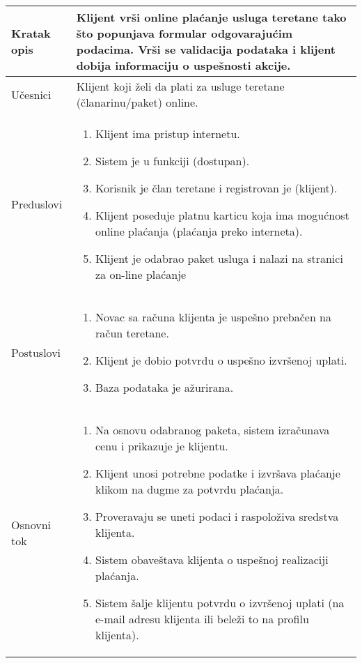 \documentclass[../main.tex]{subfiles}
\begin{document}

\begin{longtable}{| p{} | p{} |} 
\hline
    Kratak opis & Klijent vrši online plaćanje usluga teretane tako što popunjava formular odgovarajućim podacima. Vrši se validacija podataka i klijent dobija informaciju o uspešnosti akcije.\\ 
\hline    
    Učesnici & Klijent koji želi da plati za usluge teretane (članarinu/paket) online.\\
\hline
   Preduslovi & \begin{enumerate}
       \item Klijent ima pristup internetu.
       \item Sistem je u funkciji (dostupan).
       \item Korisnik je član teretane i registrovan je (klijent).
       \item Klijent poseduje platnu karticu koja ima mogućnost online plaćanja (plaćanja preko interneta).
       \item Klijent je odabrao paket usluga i nalazi na stranici za on-line plaćanje
   \end{enumerate}\\
\hline  
    Postuslovi & \begin{enumerate}
        \item Novac sa računa klijenta je uspešno prebačen na račun teretane.
		\item Klijent je dobio potvrdu o uspešno izvršenoj uplati. %
        \item Baza podataka je ažurirana.
    \end{enumerate}\\
\hline
    Osnovni tok & \begin{enumerate}
 		\item Na osnovu odabranog paketa, sistem izračunava cenu i prikazuje je klijentu.
		\item Klijent unosi potrebne podatke i izvršava plaćanje klikom na dugme za potvrdu plaćanja.
		\item Proveravaju se uneti podaci i raspoloživa sredstva klijenta.
		\item Sistem obaveštava klijenta o uspešnoj realizaciji plaćanja.
        \item Sistem šalje klijentu potvrdu o izvršenoj uplati (na e-mail adresu klijenta ili beleži to na profilu klijenta).

\end{enumerate}
\end{longtable}
\end{document}
